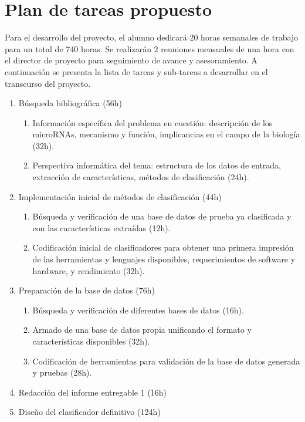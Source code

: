 \documentclass[12pt,bibliography=oldstyle,DIV=12,parskip=half-]{scrreprt}
\begin{document}
\section{Plan de tareas propuesto}
Para el desarrollo del proyecto, el alumno dedicará 20 horas semanales
de trabajo para un total de 740 horas.  Se realizarán 2
reuniones mensuales de una hora con el director de proyecto para
seguimiento de avance y asesoramiento.
%
A continuación se presenta la lista de tareas y sub-tareas a
desarrollar en el transcurso del proyecto.
\begin{enumerate}
\item Búsqueda bibliográfica (56h)
  \begin{enumerate}
  \item Información específica del problema en cuestión: descripción
    de los microRNAs, mecanismo y función, implicancias en el campo de
    la biología (32h).
  \item Perspectiva informática del tema: estructura de los datos de
    entrada, extracción de características, métodos de clasificación
    (24h).
  \end{enumerate}
\item Implementación inicial de métodos de clasificación (44h)
  \begin{enumerate}
  \item Búsqueda y verificación de una base de datos de prueba ya
    clasificada y con las características extraídas (12h).
  \item Codificación inicial de clasificadores para obtener una
    primera impresión de las herramientas y lenguajes disponibles,
    requerimientos de software y hardware, y rendimiento (32h).
  \end{enumerate}
\item Preparación de la base de datos (76h)
  \begin{enumerate}
  \item Búsqueda y verificación de diferentes bases de datos (16h).
  \item Armado de una base de datos propia unificando el formato y
    características disponibles (32h).
  \item Codificación de herramientas para validación de la base de
    datos generada y pruebas (28h).
  \end{enumerate}
\item Redacción del informe entregable 1 (16h)
\item Diseño del clasificador definitivo (124h)
  \begin{enumerate}

\end{enumerate}
\end{enumerate}
\end{document}

